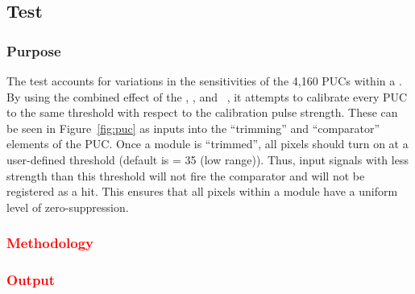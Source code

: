 \subsection{\trimming Test}
\label{ss:trimming}

\subsubsection{Purpose}

The \trimming test accounts for variations in the sensitivities of the 4,160 PUCs within a \roc.
By using the combined effect of the \vthrcomp, \vtrim, and \trimbit~\dacs,
it attempts to calibrate every PUC to the same threshold with respect to the calibration pulse strength.
These \dacs can be seen in Figure~\ref{fig:puc} as inputs into the ``trimming'' and ``comparator'' elements of the PUC.
Once a module is ``trimmed'', all pixels should turn on at a user-defined threshold (default is \vcal = 35 (low range)).
Thus, input signals with less strength than this threshold will not fire the comparator and will not be registered as a hit.
This ensures that all pixels within a module have a uniform level of zero-suppression.

\subsubsection{\textcolor{red}{Methodology}}
\subsubsection{\textcolor{red}{Output}}

